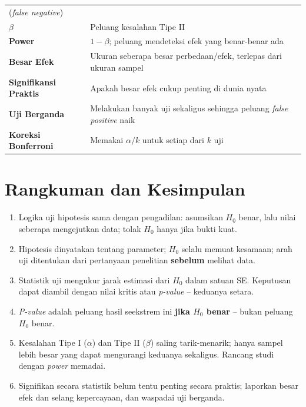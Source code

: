 \documentclass[
  indonesian,
  letterpaper,
]{book}
\providecommand{\tightlist}{%
  \setlength{\itemsep}{0pt}\setlength{\parskip}{0pt}}
\begin{document}
{\begin{longtable}[]{@{}
  >{\raggedright\arraybackslash}p{}
  >{\raggedright\arraybackslash}p{}@{}}
(\emph{false negative}) \\
\textbf{\(\beta\)} & Peluang kesalahan Tipe II \\
\textbf{Power} & \(1 - \beta\); peluang mendeteksi efek yang benar-benar
ada \\
\textbf{Besar Efek} & Ukuran seberapa besar perbedaan/efek, terlepas
dari ukuran sampel \\
\textbf{Signifikansi Praktis} & Apakah besar efek cukup penting di dunia
nyata \\
\textbf{Uji Berganda} & Melakukan banyak uji sekaligus sehingga peluang
\emph{false positive} naik \\
\textbf{Koreksi Bonferroni} & Memakai \(\alpha/k\) untuk setiap dari
\(k\) uji \\
\end{longtable}
}


\chapter{Rangkuman dan Kesimpulan}\label{rangkuman-dan-kesimpulan-1}

\begin{enumerate}
\def\labelenumi{\arabic{enumi}.}
\tightlist
\item
  Logika uji hipotesis sama dengan pengadilan: asumsikan \(H_0\) benar,
  lalu nilai seberapa mengejutkan data; tolak \(H_0\) hanya jika bukti
  kuat.
\item
  Hipotesis dinyatakan tentang parameter; \(H_0\) selalu memuat
  kesamaan; arah uji ditentukan dari pertanyaan penelitian
  \textbf{sebelum} melihat data.
\item
  Statistik uji mengukur jarak estimasi dari \(H_0\) dalam satuan SE.
  Keputusan dapat diambil dengan nilai kritis atau \emph{p-value} --
  keduanya setara.
\item
  \emph{P-value} adalah peluang hasil seekstrem ini \textbf{jika \(H_0\)
  benar} -- bukan peluang \(H_0\) benar.
\item
  Kesalahan Tipe I (\(\alpha\)) dan Tipe II (\(\beta\)) saling
  tarik-menarik; hanya sampel lebih besar yang dapat mengurangi keduanya
  sekaligus. Rancang studi dengan \emph{power} memadai.
\item
  Signifikan secara statistik belum tentu penting secara praktis;
  laporkan besar efek dan selang kepercayaan, dan waspadai uji berganda.
\end{enumerate}
\end{document}
